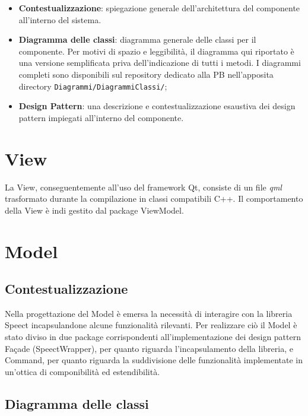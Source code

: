 \documentclass[openany,12pt,a4paper]{report}
\begin{document}
	\begin{itemize}
		\item \textbf{Contestualizzazione}: spiegazione generale dell'architettura del componente all'interno del sistema.
		\item \textbf{Diagramma delle classi}: diagramma generale delle classi per il componente. Per motivi di spazio e leggibilità, il diagramma qui riportato è una versione semplificata priva dell'indicazione di tutti i metodi. I diagrammi completi sono disponibili sul repository dedicato alla PB nell'apposita directory \verb|Diagrammi/DiagrammiClassi/|;
		\item \textbf{Design Pattern}: una descrizione e contestualizzazione esaustiva dei design pattern impiegati all'interno del componente.
	\end{itemize} 
	
	\section{View}
	
	La View, conseguentemente all’uso del framework Qt, consiste di un file \textit{qml} trasformato durante la compilazione in classi compatibili C++. Il comportamento della View è indi gestito dal package ViewModel. 
	
	\section{Model}
	
	\subsection{Contestualizzazione}
	
	Nella progettazione del Model è emersa la necessità di interagire con la libreria Speect incapsulandone alcune funzionalità rilevanti. Per realizzare ciò il Model è stato diviso in due package corrispondenti all'implementazione dei design pattern Façade (SpeectWrapper), per quanto riguarda l'incapsulamento della libreria, e Command, per quanto riguarda la suddivisione delle funzionalità implementate in un'ottica di componibilità ed estendibilità.  
	
	\subsection{Diagramma delle classi}
	
\end{document}
